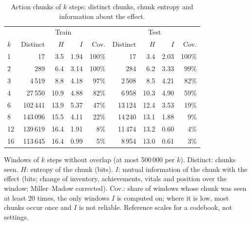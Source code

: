 \begin{table}[H]
\centering
\caption{Action chunks of $k$ steps: distinct chunks, chunk entropy and information about the effect.}
\label{tab:data-chunks}
\small
\setlength{\tabcolsep}{3.5pt}
\begin{tabular}{lrrrrrrrr}
\toprule
& \multicolumn{4}{c}{Train} & \multicolumn{4}{c}{Test} \\
 $k$ & Distinct & $H$ & $I$ & Cov. & Distinct & $H$ & $I$ & Cov. \\
\midrule
1 & 17 & 3.5 & 1.94 & 100\% & 17 & 3.4 & 2.03 & 100\% \\
2 & 289 & 6.4 & 3.14 & 100\% & 284 & 6.2 & 3.33 & 99\% \\
3 & 4\,519 & 8.8 & 4.18 & 97\% & 2\,508 & 8.5 & 4.21 & 82\% \\
4 & 27\,550 & 10.9 & 4.88 & 82\% & 6\,958 & 10.3 & 4.90 & 59\% \\
6 & 102\,441 & 13.9 & 5.37 & 47\% & 13\,124 & 12.4 & 3.53 & 19\% \\
8 & 143\,096 & 15.5 & 4.11 & 22\% & 14\,240 & 13.1 & 1.88 & 9\% \\
12 & 139\,619 & 16.4 & 1.91 & 8\% & 11\,474 & 13.2 & 0.60 & 4\% \\
16 & 113\,645 & 16.4 & 0.99 & 5\% & 8\,954 & 13.0 & 0.61 & 3\% \\
\bottomrule
\end{tabular}

\vspace{4pt}
\begin{minipage}{\linewidth}
\footnotesize\raggedright Windows of $k$ steps without overlap (at most 500\,000 per $k$). Distinct: chunks seen. $H$: entropy of the chunk (bits). $I$: mutual information of the chunk with the effect (bits; change of inventory, achievements, vitals and position over the window; Miller--Madow corrected). Cov.: share of windows whose chunk was seen at least 20 times, the only windows $I$ is computed on; where it is low, most chunks occur once and $I$ is not reliable. Reference scales for a codebook, not settings.
\end{minipage}
\end{table}
